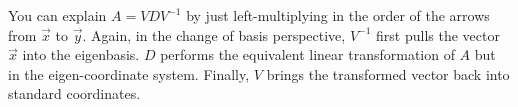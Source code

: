 \begin{enumerate}[resume]
{  You can explain $A = VDV^{-1}$ by just left-multiplying in the order of the arrows from $\vec{x}$ to $\vec{y}$. Again, in the change of basis perspective, $V^{-1}$ first pulls the vector $\vec{x}$ into the eigenbasis. $D$ performs the equivalent linear transformation of $A$ but in the eigen-coordinate system. Finally, $V$ brings the transformed vector back into standard coordinates.
}

\end{enumerate}
